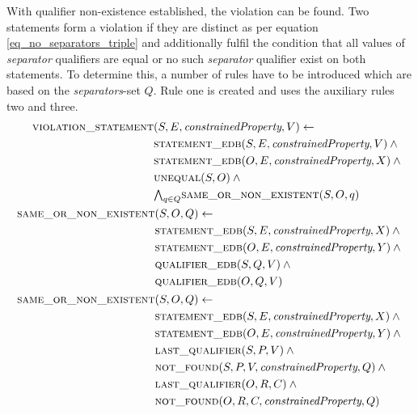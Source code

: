 \documentclass[hyperref,bachelorofscience,fleqn]{cgvpub}
\begin{document}
With qualifier non-existence established, the violation can be found. Two statements form a violation if they are distinct as per equation \ref{eq_no_separators_triple} and additionally fulfil the condition that all values of \emph{separator} qualifiers are equal or no such \emph{separator} qualifier exist on both statements. To determine this, a number of rules have to be introduced which are based on the \emph{separators}-set \(Q\). Rule one is created and uses the auxiliary rules two and three. 
\begin{align}
\begin{split}
\textsc{violation\_statement}&(S, E, \emph{constrainedProperty}, V) \leftarrow \\
&\textsc{statement\_edb}(S, E, \emph{constrainedProperty}, V) \wedge{} \\
&\textsc{statement\_edb}(O, E, \emph{constrainedProperty}, X) \wedge{} \\
&\textsc{unequal}(S, O) \wedge{} \\
&{\textstyle\bigwedge}_{q \in Q} \textsc{same\_or\_non\_existent}(S, O, q)
\end{split}\\
\begin{split}
\textsc{same\_or\_non\_existent}&(S, O, Q) \leftarrow \\
&\textsc{statement\_edb}(S, E, \emph{constrainedProperty}, X) \wedge{} \\
&\textsc{statement\_edb}(O, E, \emph{constrainedProperty}, Y) \wedge{} \\
&\textsc{qualifier\_edb}(S, Q, V) \wedge{} \\
&\textsc{qualifier\_edb}(O, Q, V)
\end{split}\\
\begin{split}
\textsc{same\_or\_non\_existent}&(S, O, Q) \leftarrow{} \\
&\textsc{statement\_edb}(S, E, \emph{constrainedProperty}, X) \wedge{} \\
&\textsc{statement\_edb}(O, E, \emph{constrainedProperty}, Y) \wedge{} \\
&\textsc{last\_qualifier}(S, P, V) \wedge{} \\
&\textsc{not\_found}(S, P, V, \emph{constrainedProperty}, Q) \wedge{} \\
&\textsc{last\_qualifier}(O, R, C) \wedge{} \\
&\textsc{not\_found}(O, R, C, \emph{constrainedProperty}, Q)
\end{split}
\end{align}
\end{document}
